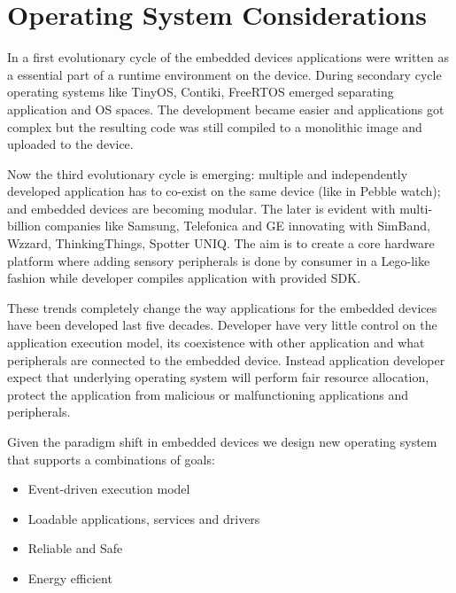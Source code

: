 \section{Operating System Considerations}

In a first evolutionary cycle of the embedded devices applications were written
as a essential part of a runtime environment on the device. During secondary
cycle operating systems like TinyOS, Contiki, FreeRTOS emerged separating
application and OS spaces. The development became easier  and applications
got complex but the resulting code was still compiled to a monolithic image and
uploaded to the device.

Now the third evolutionary cycle is emerging: multiple and independently
developed application has to co-exist on the same device (like in Pebble watch);
and embedded devices are becoming modular. The later is evident with
multi-billion companies like Samsung, Telefonica and GE innovating with SimBand, Wzzard, ThinkingThings, Spotter UNIQ.
The aim is to create a core hardware platform where adding sensory
peripherals is done by consumer in a Lego-like fashion while developer compiles
application with provided SDK.

These trends completely change the way applications for the embedded devices
have been developed last five decades. Developer have very little control on the
application execution model, its coexistence with other application and what
peripherals are connected to the embedded device. Instead application developer
expect that underlying operating system will perform fair resource allocation,
protect the application from malicious or malfunctioning applications and
peripherals. 

Given the paradigm shift in embedded devices we design new operating system
\name that supports a combinations of goals:


\begin{itemize}
  \item Event-driven execution model
  \item Loadable applications, services and drivers
  \item Reliable and Safe %
  \item Energy efficient 
\end{itemize}

